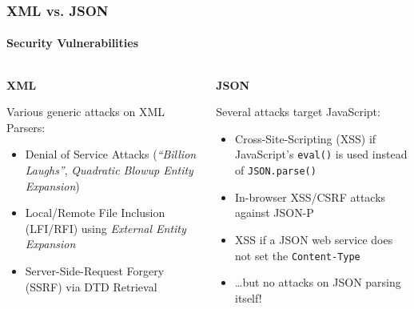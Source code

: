 \documentclass[
    alternativetitlepage=alternativ,
    cornerlogo=hgi_nds_logo2,
    sectionoverview,
]{rubpresentation}
\begin{document}
\begin{frame}
    \frametitle{XML vs. JSON}
    \framesubtitle{Security Vulnerabilities}
    \begin{columns}[t]
        \begin{column}{0.5\textwidth}
            \begin{center}\textbf{\Large XML}\end{center}
            Various generic attacks on XML Parsers:
            \begin{itemize}
                \item{} Denial of Service Attacks %
                        (\emph{\enquote{Billion Laughs}}, %
                        \emph{Quadratic Blowup Entity Expansion})\\
                \item{} Local/Remote File Inclusion (LFI/RFI) using %
                        \emph{External Entity Expansion}\\
                \item{} Server-Side-Request Forgery (SSRF) via DTD Retrieval\\
            \end{itemize}
        \end{column}
        \begin{column}{0.5\textwidth}
            \begin{center}\textbf{\Large JSON}\end{center}
            Several attacks target JavaScript:
            \begin{itemize}
                \item{} Cross-Site-Scripting (XSS) if JavaScript's %
                        \texttt{eval()} is used instead of%
                        \texttt{JSON.parse()}\\
                \item{} In-browser XSS/CSRF attacks against JSON-P\\
                \item{} XSS if a JSON web service does not set the
                        \texttt{Content-Type}\\
                \item{} \ldots{}but no attacks on JSON parsing itself!\\
            \end{itemize}
        \end{column}
    \end{columns}
\end{frame}
\end{document}
